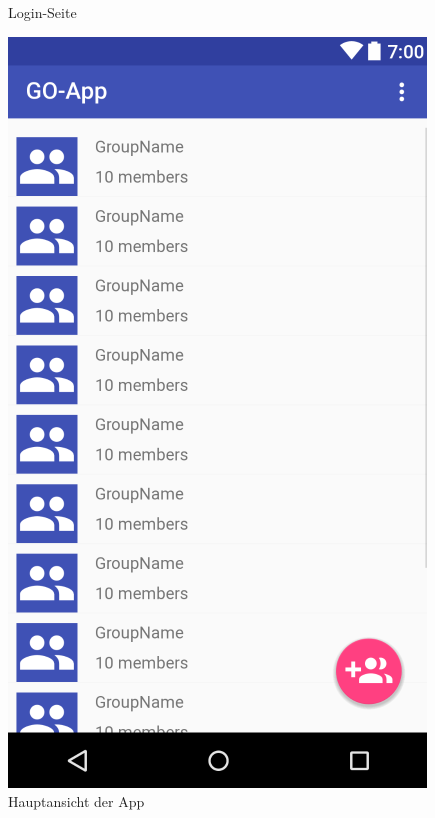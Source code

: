 \documentclass[parskip=full]{scrartcl}
\begin{document}
\begin{figure}[H]
\begin{minipage}[b]{0.4\textwidth}
	\caption{Login-Seite}	\label{login} 
  \end{minipage}
  \hfill
  \begin{minipage}[b]{0.4\textwidth}
    \includegraphics[width=\textwidth]{GUI/AndroidStudio/hauptansicht.PNG}
	\caption{Hauptansicht der App}	\label{hauptansicht}
  \end{minipage}
  \vspace{1cm}
\end{figure}
\end{document}
